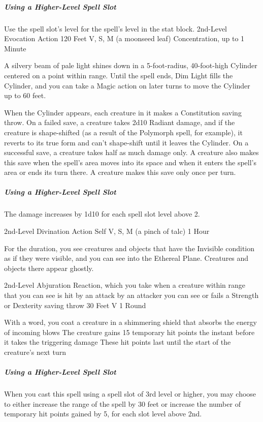 \documentclass[letterpaper,openany,oneside,twocolumn]{book}
\begin{document}
\subparagraph*{Using a Higher-Level Spell Slot} Use the spell slot's level for the spell's level in the stat block.
\vfill\eject
{}
	{2nd-Level Evocation}
	{Action}
	{120 Feet}
	{V, S, M (a moonseed leaf)}
	{Concentration, up to 1 Minute}

A silvery beam of pale light shines down in a 5-foot-radius, 40-foot-high Cylinder centered on a point within range. Until the spell ends, Dim Light fills the Cylinder, and you can take a Magic action on later turns to move the Cylinder up to 60 feet.

When the Cylinder appears, each creature in it makes a Constitution saving throw. On a failed save, a creature takes 2d10 Radiant damage, and if the creature is shape-shifted (as a result of the Polymorph spell, for example), it reverts to its true form and can't shape-shift until it leaves the Cylinder. On a successful save, a creature takes half as much damage only. A creature also makes this save when the spell's area moves into its space and when it enters the spell's area or ends its turn there. A creature makes this save only once per turn.

\subparagraph*{Using a Higher-Level Spell Slot} The damage increases by 1d10 for each spell slot level above 2.

	{2nd-Level Divination}
	{Action}
	{Self}
	{V, S, M (a pinch of talc)}
	{1 Hour}

For the duration, you see creatures and objects that have the Invisible condition as if they were visible, and you can see into the Ethereal Plane. Creatures and objects there appear ghostly.

	{2nd-Level Abjuration}
	{Reaction, which you take when a creature within range that you can see is hit by an attack by an attacker you can see or fails a Strength or Dexterity saving throw}
	{30 Feet}
	{V}
	{1 Round}

With a word, you coat a creature in a shimmering shield that absorbs the energy of incoming blows The creature gains 15 temporary hit points the instant before it takes the triggering damage These hit points last until the start of the creature's next turn

\subparagraph*{Using a Higher-Level Spell Slot} When you cast this spell using a spell slot of 3rd level or higher, you may choose to either increase the range of the spell by 30 feet or increase the number of temporary hit points gained by 5, for each slot level above 2nd.
\end{document}
